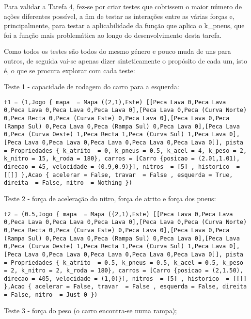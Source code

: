 \documentclass[a4paper]{report}
\begin{document}
Para validar a Tarefa 4, fez-se por criar testes que cobrissem o maior número de ações diferentes possível, a fim de testar as interações entre as várias forças e, principalmente, para testar a aplicabilidade da função que aplica o k\_pneus, que foi a função mais problemática ao longo do desenvolvimento desta tarefa.

Como todos os testes são todos do mesmo género e pouco muda de uns para outros, de seguida vai-se apenas dizer sinteticamente o propósito de cada um, isto é, o que se procura explorar com cada teste:

Teste 1 - capacidade de rodagem do carro para a esquerda:

\begin{lstlisting}
t1 = (1,Jogo { mapa  = Mapa ((2,1),Este) [[Peca Lava 0,Peca Lava 0,Peca Lava 0,Peca Lava 0,Peca Lava 0],[Peca Lava 0,Peca (Curva Norte) 0,Peca Recta 0,Peca (Curva Este) 0,Peca Lava 0],[Peca Lava 0,Peca (Rampa Sul) 0,Peca Lava 0,Peca (Rampa Sul) 0,Peca Lava 0],[Peca Lava 0,Peca (Curva Oeste) 1,Peca Recta 1,Peca (Curva Sul) 1,Peca Lava 0],[Peca Lava 0,Peca Lava 0,Peca Lava 0,Peca Lava 0,Peca Lava 0]], pista = Propriedades { k_atrito  = 0, k_pneus = 0.5, k_acel = 4, k_peso = 2, k_nitro = 15, k_roda = 180}, carros = [Carro {posicao = (2.01,1.01), direcao = 45, velocidade = (0.9,0.9)}], nitros  = [5] , historico  = [[]] },Acao { acelerar = False, travar  = False , esquerda = True, direita  = False, nitro  = Nothing })
\end{lstlisting}

Teste 2 - força de aceleração do nitro, força de atrito e força dos pneus:

\begin{lstlisting}
t2 = (0.5,Jogo { mapa  = Mapa ((2,1),Este) [[Peca Lava 0,Peca Lava 0,Peca Lava 0,Peca Lava 0,Peca Lava 0],[Peca Lava 0,Peca (Curva Norte) 0,Peca Recta 0,Peca (Curva Este) 0,Peca Lava 0],[Peca Lava 0,Peca (Rampa Sul) 0,Peca Lava 0,Peca (Rampa Sul) 0,Peca Lava 0],[Peca Lava 0,Peca (Curva Oeste) 1,Peca Recta 1,Peca (Curva Sul) 1,Peca Lava 0],[Peca Lava 0,Peca Lava 0,Peca Lava 0,Peca Lava 0,Peca Lava 0]], pista = Propriedades { k_atrito  = 0.5, k_pneus = 0.5, k_acel = 0.5, k_peso = 2, k_nitro = 2, k_roda = 180}, carros = [Carro {posicao = (2,1.50), direcao = 405, velocidade = (1,0)}], nitros  = [5] , historico  = [[]] },Acao { acelerar = False, travar  = False , esquerda = False, direita  = False, nitro  = Just 0 })
\end{lstlisting}

Teste 3 - força do peso (o carro encontra-se numa rampa);
\end{document}
